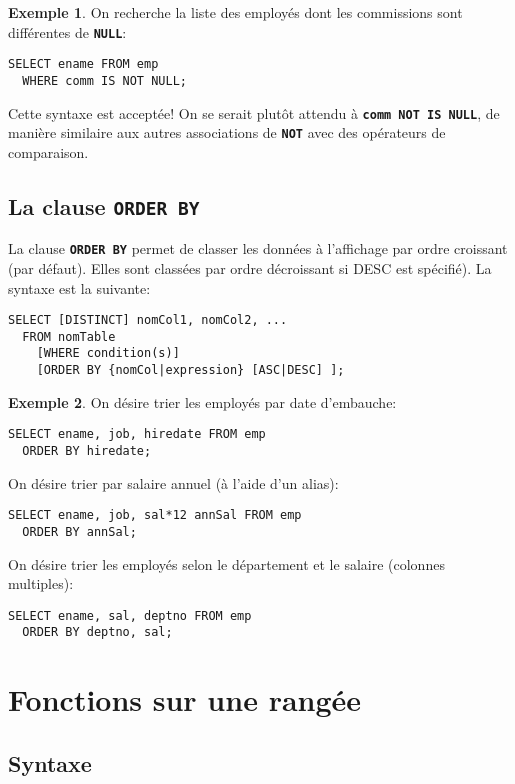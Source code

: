 \documentclass[a4paper, 12pt]{report}
\newcommand{\textSQL}[1]{\texttt{\textbf{#1}}}
\theoremstyle{definition} \newtheorem{ex}{Exemple}
\begin{document}
\begin{ex}
On recherche la liste des employés dont les commissions sont différentes de \textSQL{NULL}:
	\begin{lstlisting}[frame=single]
SELECT ename FROM emp
  WHERE comm IS NOT NULL;
  \end{lstlisting}
Cette syntaxe est acceptée! On se serait plutôt attendu à \textSQL{comm NOT IS NULL}, de manière similaire aux autres associations de \textSQL{NOT} avec des opérateurs de comparaison.
\end{ex}


\section{La clause \textSQL{ORDER BY}}
La clause \textSQL{ORDER BY} permet de classer les données à l'affichage par ordre croissant (par défaut). Elles sont classées par ordre décroissant si DESC est spécifié). La syntaxe est la suivante:
\begin{lstlisting}[frame=single]
SELECT [DISTINCT] nomCol1, nomCol2, ...
  FROM nomTable
	[WHERE condition(s)]
	[ORDER BY {nomCol|expression} [ASC|DESC] ];
\end{lstlisting}
\begin{ex}
On désire trier les employés par date d'embauche:
	\begin{lstlisting}[frame=single]
SELECT ename, job, hiredate FROM emp
  ORDER BY hiredate;
\end{lstlisting}
On désire trier par salaire annuel (à l'aide d'un alias):
	\begin{lstlisting}[frame=single]
SELECT ename, job, sal*12 annSal FROM emp
  ORDER BY annSal;
\end{lstlisting}
On désire trier  les employés selon le département et le salaire (colonnes multiples):
	\begin{lstlisting}[frame=single]
SELECT ename, sal, deptno FROM emp
  ORDER BY deptno, sal;
\end{lstlisting}
\end{ex}

\chapter{Fonctions sur une rangée}

\section{Syntaxe}
\end{document}
